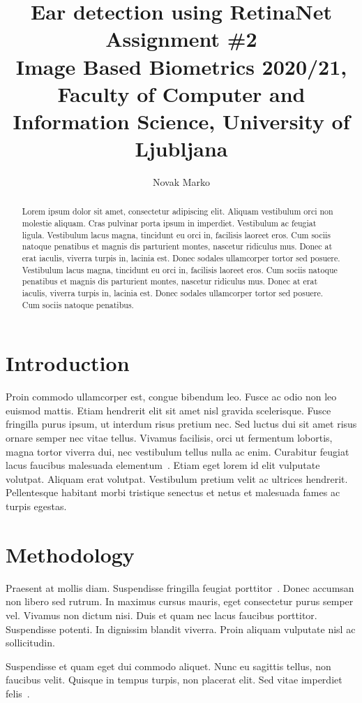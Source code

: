 \documentclass[9pt]{IEEEtran}
\title{\vspace{0ex} %
Ear detection using RetinaNet
\\ \large{Assignment \#2}\\ \normalsize{Image Based Biometrics 2020/21, Faculty of Computer and Information Science, University of Ljubljana}}
\author{ %
Novak Marko
\vspace{-4.0ex}
}
\begin{document}
\maketitle

\begin{abstract}
Lorem ipsum dolor sit amet, consectetur adipiscing elit. Aliquam vestibulum orci non molestie aliquam. Cras pulvinar porta ipsum in imperdiet. Vestibulum ac feugiat ligula. Vestibulum lacus magna, tincidunt eu orci in, facilisis laoreet eros. Cum sociis natoque penatibus et magnis dis parturient montes, nascetur ridiculus mus. Donec at erat iaculis, viverra turpis in, lacinia est. Donec sodales ullamcorper tortor sed posuere. Vestibulum lacus magna, tincidunt eu orci in, facilisis laoreet eros. Cum sociis natoque penatibus et magnis dis parturient montes, nascetur ridiculus mus. Donec at erat iaculis, viverra turpis in, lacinia est. Donec sodales ullamcorper tortor sed posuere. Cum sociis natoque penatibus.
\end{abstract}

\section{Introduction}
Proin commodo ullamcorper est, congue bibendum leo. Fusce ac odio non leo euismod mattis. Etiam hendrerit elit sit amet nisl gravida scelerisque. Fusce fringilla purus ipsum, ut interdum risus pretium nec. Sed luctus dui sit amet risus ornare semper nec vitae tellus. Vivamus facilisis, orci ut fermentum lobortis, magna tortor viverra dui, nec vestibulum tellus nulla ac enim. Curabitur feugiat lacus faucibus malesuada elementum~\cite{neurocomputing4,neurocomputing5}. Etiam eget lorem id elit vulputate volutpat. Aliquam erat volutpat. Vestibulum pretium velit ac ultrices hendrerit. Pellentesque habitant morbi tristique senectus et netus et malesuada fames ac turpis egestas.

\section{Methodology}
Praesent at mollis diam. Suspendisse fringilla feugiat porttitor~\cite{neuro2008,neuro2013}. Donec accumsan non libero sed rutrum. In maximus cursus mauris, eget consectetur purus semper vel. Vivamus non dictum nisi. Duis et quam nec lacus faucibus porttitor. Suspendisse potenti. In dignissim blandit viverra. Proin aliquam vulputate nisl ac sollicitudin.

 Suspendisse et quam eget dui commodo aliquet. Nunc eu sagittis tellus, non faucibus velit. Quisque in tempus turpis, non placerat elit. Sed vitae imperdiet felis~\cite{Jain2004,Jain2011}.
\end{document}
